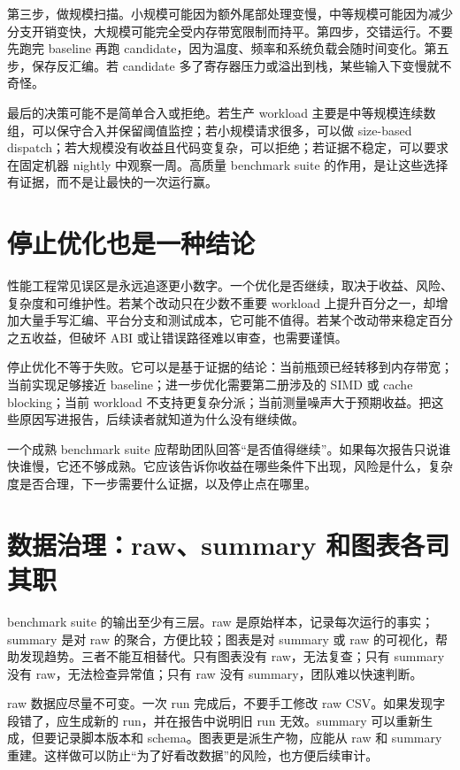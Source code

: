 第三步，做规模扫描。小规模可能因为额外尾部处理变慢，中等规模可能因为减少分支开销变快，大规模可能完全受内存带宽限制而持平。第四步，交错运行。不要先跑完 baseline 再跑 candidate，因为温度、频率和系统负载会随时间变化。第五步，保存反汇编。若 candidate 多了寄存器压力或溢出到栈，某些输入下变慢就不奇怪。

最后的决策可能不是简单合入或拒绝。若生产 workload 主要是中等规模连续数组，可以保守合入并保留阈值监控；若小规模请求很多，可以做 size-based dispatch；若大规模没有收益且代码变复杂，可以拒绝；若证据不稳定，可以要求在固定机器 nightly 中观察一周。高质量 benchmark suite 的作用，是让这些选择有证据，而不是让最快的一次运行赢。

\section{停止优化也是一种结论}

性能工程常见误区是永远追逐更小数字。一个优化是否继续，取决于收益、风险、复杂度和可维护性。若某个改动只在少数不重要 workload 上提升百分之一，却增加大量手写汇编、平台分支和测试成本，它可能不值得。若某个改动带来稳定百分之五收益，但破坏 ABI 或让错误路径难以审查，也需要谨慎。

停止优化不等于失败。它可以是基于证据的结论：当前瓶颈已经转移到内存带宽；当前实现足够接近 baseline；进一步优化需要第二册涉及的 SIMD 或 cache blocking；当前 workload 不支持更复杂分派；当前测量噪声大于预期收益。把这些原因写进报告，后续读者就知道为什么没有继续做。

一个成熟 benchmark suite 应帮助团队回答“是否值得继续”。如果每次报告只说谁快谁慢，它还不够成熟。它应该告诉你收益在哪些条件下出现，风险是什么，复杂度是否合理，下一步需要什么证据，以及停止点在哪里。

\section{数据治理：raw、summary 和图表各司其职}

benchmark suite 的输出至少有三层。raw 是原始样本，记录每次运行的事实；summary 是对 raw 的聚合，方便比较；图表是对 summary 或 raw 的可视化，帮助发现趋势。三者不能互相替代。只有图表没有 raw，无法复查；只有 summary 没有 raw，无法检查异常值；只有 raw 没有 summary，团队难以快速判断。

raw 数据应尽量不可变。一次 run 完成后，不要手工修改 raw CSV。如果发现字段错了，应生成新的 run，并在报告中说明旧 run 无效。summary 可以重新生成，但要记录脚本版本和 schema。图表更是派生产物，应能从 raw 和 summary 重建。这样做可以防止“为了好看改数据”的风险，也方便后续审计。

